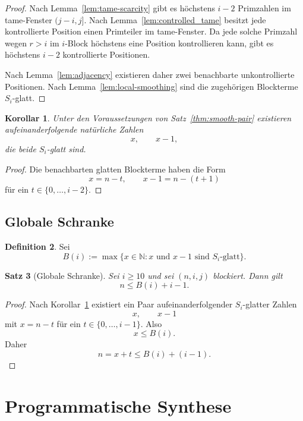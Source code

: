 \documentclass[12pt,a4paper]{article}
\theoremstyle{plain}
\newtheorem{theorem}{Satz}[section]
\newtheorem{corollary}[theorem]{Korollar}
\theoremstyle{definition}
\newtheorem{definition}[theorem]{Definition}
\theoremstyle{remark}
\begin{document}
	\begin{proof}
		Nach Lemma~\ref{lem:tame-scarcity} gibt es höchstens \(i-2\) Primzahlen im tame-Fenster \((j-i,j]\). Nach Lemma~\ref{lem:controlled_tame} besitzt jede kontrollierte Position einen Primteiler im tame-Fenster. Da jede solche Primzahl wegen \(r>i\) im \(i\)-Block höchstens eine Position kontrollieren kann, gibt es höchstens \(i-2\) kontrollierte Positionen.
		
		Nach Lemma~\ref{lem:adjacency} existieren daher zwei benachbarte unkontrollierte Positionen. Nach Lemma~\ref{lem:local-smoothing} sind die zugehörigen Blockterme \(S_i\)-glatt.
	\end{proof}
	
	\begin{corollary}
		\label{cor:xy}
		Unter den Voraussetzungen von Satz~\ref{thm:smooth-pair} existieren aufeinanderfolgende natürliche Zahlen
		\[
		x,\qquad x-1,
		\]
		die beide \(S_i\)-glatt sind.
	\end{corollary}
	
	\begin{proof}
		Die benachbarten glatten Blockterme haben die Form
		\[
		x=n-t,\qquad x-1=n-(t+1)
		\]
		für ein \(t\in\{0,\dots,i-2\}\).
	\end{proof}
	
	\subsection{Globale Schranke}
	
	\begin{definition}
		Sei
		\[
		B(i):=\max\{x\in\mathbb N : x \text{ und } x-1 \text{ sind } S_i\text{-glatt}\}.
		\]
	\end{definition}
	
	\begin{theorem}[Globale Schranke]
		\label{thm:global-bound}
		Sei \(i\ge10\) und sei \((n,i,j)\) blockiert. Dann gilt
		\[
		n\le B(i)+i-1.
		\]
	\end{theorem}
	
	\begin{proof}
		Nach Korollar~\ref{cor:xy} existiert ein Paar aufeinanderfolgender \(S_i\)-glatter Zahlen
		\[
		x,\qquad x-1
		\]
		mit \(x=n-t\) für ein \(t\in\{0,\dots,i-1\}\). Also
		\[
		x\le B(i).
		\]
		Daher
		\[
		n=x+t\le B(i)+(i-1).
		\]
	\end{proof}
	
	\section{Programmatische Synthese}
	
\end{document}
